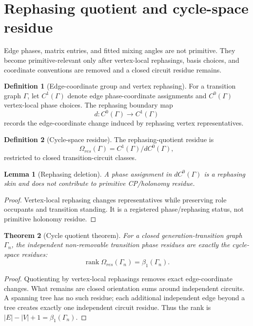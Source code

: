 \documentclass[11pt]{article}
\newcommand{\rank}{\operatorname{rank}}
\theoremstyle{definition}
\newtheorem{definition}{Definition}[section]
\theoremstyle{plain}
\newtheorem{theorem}{Theorem}[section]
\newtheorem{lemma}[theorem]{Lemma}
\theoremstyle{remark}
\begin{document}
\section{Rephasing quotient and cycle-space residue}

Edge phases, matrix entries, and fitted mixing angles are not primitive. They become primitive-relevant only after vertex-local rephasings, basis choices, and coordinate conventions are removed and a closed circuit residue remains.

\begin{definition}[Edge-coordinate group and vertex rephasing]
For a transition graph \(\Gamma\), let \(C^1(\Gamma)\) denote edge phase-coordinate assignments and \(C^0(\Gamma)\) vertex-local phase choices. The rephasing boundary map
\[
d:C^0(\Gamma)\to C^1(\Gamma)
\]
records the edge-coordinate change induced by rephasing vertex representatives.
\end{definition}

\begin{definition}[Cycle-space residue]
The rephasing-quotient residue is
\[
\Omega_{res}(\Gamma)=C^1(\Gamma)/dC^0(\Gamma),
\]
restricted to closed transition-circuit classes.
\end{definition}

\begin{lemma}[Rephasing deletion]
A phase assignment in \(dC^0(\Gamma)\) is a rephasing skin and does not contribute to primitive CP/holonomy residue.
\end{lemma}
\begin{proof}
Vertex-local rephasing changes representatives while preserving role occupants and transition standing. It is a registered phase/rephasing status, not primitive holonomy residue.
\end{proof}

\begin{theorem}[Cycle quotient theorem]
For a closed generation-transition graph \(\Gamma_n\), the independent non-removable transition phase residues are exactly the cycle-space residues:
\[
\rank \Omega_{res}(\Gamma_n)=\beta_1(\Gamma_n).
\]
\end{theorem}
\begin{proof}
Quotienting by vertex-local rephasings removes exact edge-coordinate changes. What remains are closed orientation sums around independent circuits. A spanning tree has no such residue; each additional independent edge beyond a tree creates exactly one independent circuit residue. Thus the rank is \(|E|-|V|+1=\beta_1(\Gamma_n)\).
\end{proof}
\end{document}
